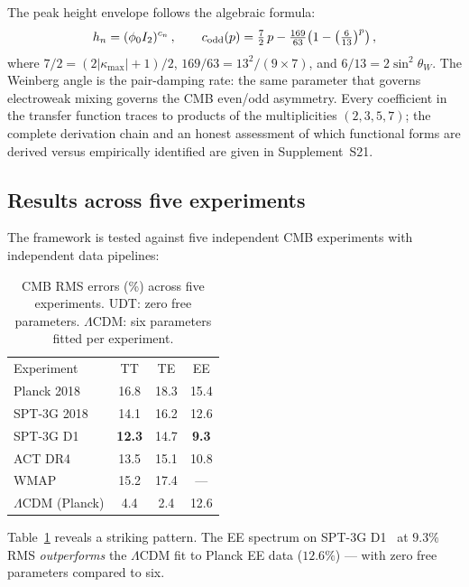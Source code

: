 \documentclass[aps,prd,twocolumn,superscriptaddress,nofootinbib,longbibliography]{revtex4-2}
\newcommand{\phiz}{\phi_0}
\newcommand{\kmax}{|\kappa_{\mathrm{max}}|}
\begin{document}
The peak height envelope follows the algebraic formula:
\begin{equation}
  h_n = (\phiz I_2)^{c_n}\,,
  \qquad c_{\rm odd}(p) = \tfrac{7}{2}\,p -
  \tfrac{169}{63}\bigl(1 - \bigl(\tfrac{6}{13}\bigr)^p\bigr)\,,
\end{equation}
where $7/2 = (2\kmax+1)/2$, $169/63 = 13^2/(9 \times 7)$, and
$6/13 = 2\sin^2\!\theta_W$.  The Weinberg angle is the pair-damping
rate: the same parameter that governs electroweak mixing governs the
CMB even/odd asymmetry.  Every coefficient in the transfer function
traces to products of the multiplicities $(2, 3, 5, 7)$; the complete
derivation chain and an honest assessment of which functional forms
are derived versus empirically identified are given in
Supplement~S21.

\subsection{Results across five experiments}

The framework is tested against five independent CMB experiments with
independent data pipelines:

\begin{table}[t]
\caption{\label{tab:cmb}%
CMB RMS errors (\%) across five experiments.  UDT: zero free
parameters.  $\Lambda$CDM: six parameters fitted per experiment.}
\begin{ruledtabular}
\begin{tabular}{lccc}
Experiment & TT & TE & EE \\
\colrule
Planck 2018       & 16.8 & 18.3 & 15.4 \\
SPT-3G 2018~\cite{SPT3G2018} & 14.1 & 16.2 & 12.6 \\
SPT-3G D1~\cite{SPT3GD1}         & \textbf{12.3} & 14.7 & \textbf{9.3} \\
ACT DR4~\cite{ACT2020}           & 13.5 & 15.1 & 10.8 \\
WMAP~\cite{WMAP2013}                    & 15.2 & 17.4 & --- \\
\colrule
$\Lambda$CDM (Planck) & 4.4 & 2.4 & 12.6 \\
\end{tabular}
\end{ruledtabular}
\end{table}

Table~\ref{tab:cmb} reveals a striking pattern.  The EE spectrum on
SPT-3G D1~\cite{SPT3GD1} at $9.3\%$ RMS \emph{outperforms} the $\Lambda$CDM fit to
Planck EE data ($12.6\%$) --- with zero free parameters compared to
six.
\end{document}
